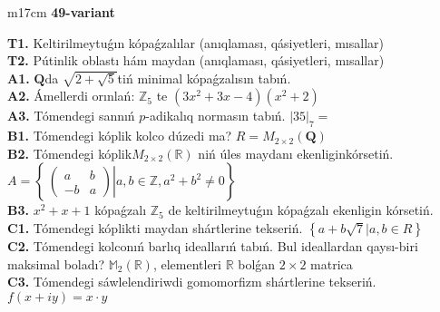 \documentclass{article}
\begin{document}
\begin{tabular}{m{17cm}}
\textbf{49-variant}
\newline

\textbf{T1.} Keltirilmeytuǵın kópaǵzalılar (anıqlaması, qásiyetleri, mısallar) \\
\textbf{T2.} Pútinlik oblastı hám maydan (anıqlaması, qásiyetleri, mısallar) \\
\textbf{A1.} \(\mathbf{Q}\)da \(\sqrt{2 + \sqrt{5}}\)tiń minimal kópaǵzalısın tabıń. \\
\textbf{A2.} Ámellerdi orınlań: \(\mathbb{Z}_{5}\) te \(\left( 3x^{2} + 3x - 4 \right)\left( x^{2} + 2 \right)\) \\
\textbf{A3.} Tómendegi sannıń \(p\)-adikalıq normasın tabıń. \(|35|_{7} =\) \\
\textbf{B1.} Tómendegi kóplik kolco dúzedi ma? \(R = M_{2 \times 2}\left( \mathbf{Q} \right)\) \\
\textbf{B2.} Tómendegi kóplik\(M_{2 \times 2}\left( \mathbb{R} \right)\) niń úles maydanı ekenliginkórsetiń. \(A = \left\{ \left. \ \begin{pmatrix}
a & b \\
 - b & a
\end{pmatrix} \right|a,b\mathbb{\in Z},a^{2} + b^{2} \neq 0 \right\}\) \\
\textbf{B3.} \(x^{2} + x + 1\) kópaǵzalı \(\mathbb{Z}_{5}\) de keltirilmeytuǵın kópaǵzalı ekenligin kórsetiń. \\
\textbf{C1.} Tómendegi kóplikti maydan shártlerine tekseriń. \(\left\{ a + b\sqrt{7}|a,b \in R \right\}\) \\
\textbf{C2.} Tómendegi kolconıń barlıq ideallarıń tabıń. Bul ideallardan qaysı-biri maksimal boladı? \(\mathbb{M}_{2}\left( \mathbb{R} \right)\), elementleri \(\mathbb{R}\) bolǵan \(2 \times 2\) matrica \\
\textbf{C3.} Tómendegi sáwlelendiriwdi gomomorfizm shártlerine tekseriń. \(f(x + iy) = x \cdot y\) \\

\end{tabular}
\vspace{1cm}
\end{document}
